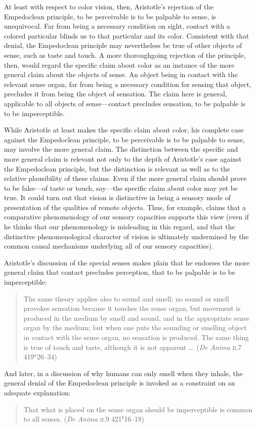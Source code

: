 At least with respect to color vision, then, Aristotle's rejection of the Empedoclean principle, to be perceivable is to be palpable to sense, is unequivocal. Far from being a necessary condition on sight, contact with a colored particular blinds us to that particular and its color. Consistent with that denial, the Empedoclean principle may nevertheless be true of other objects of sense, such as taste and touch. A more thoroughgoing rejection of the principle, then, would regard the specific claim about color as an instance of the more general claim about the objects of sense. An object being in contact with the relevant sense organ, far from being a necessary condition for sensing that object, precludes it from being the object of sensation. The claim here is general, applicable to all objects of sense---contact precludes sensation, to be palpable is to be imperceptible.

While Aristotle at least makes the specific claim about color, his complete case against the Empedoclean principle, to be perceivable is to be palpable to sense, may involve the more general claim. The distinction between the specific and more general claim is relevant not only to the depth of Aristotle's case against the Empedoclean principle, but the distinction is relevant as well as to the relative plausibility of these claims. Even if the more general claim should prove to be false---of taste or touch, say---the specific claim about color may yet be true. It could turn out that vision is distinctive in being a sensory mode of presentation of the qualities of remote objects. Thus, for example, \citet[]{Broad:1952kx} claims that a comparative phenomenology of our sensory capacities supports this view (even if he thinks that our phenomenology is misleading in this regard, and that the distinctive phenomenological character of vision is ultimately undermined by the common causal mechanisms underlying all of our sensory capacities).

Aristotle's discussion of the special senses makes plain that he endorses the more general claim that contact precludes perception, that to be palpable is to be imperceptible:
\begin{quote}
	The same theory applies also to sound and smell; no sound or smell provokes sensation because it touches the sense organ, but movement is produced in the medium by smell and sound, and in the appropriate sense organ by the medium; but when one puts the sounding or smelling object in contact with the sense organ, no sensation is produced. The same thing is true of touch and taste, although it is not apparent \ldots\ (\emph{De Anima} \textsc{ii}.7 419\( ^{a} \)26--34)
\end{quote}
And later, in a discussion of why humans can only smell when they inhale, the general denial of the Empedoclean principle is invoked as a constraint on an adequate explanation:
\begin{quote}
	That what is placed on the sense organ should be imperceptible is common to all senses. (\emph{De Anima} \textsc{ii}.9 421\( ^{b} \)16--18)
\end{quote}

